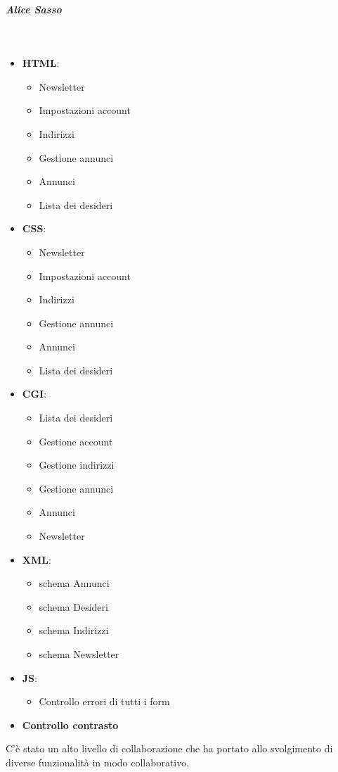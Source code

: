 	\subparagraph{Alice Sasso}~
		
		\begin{itemize}
		\item \textbf{HTML}:
			\begin{itemize}
				\item Newsletter
				\item Impostazioni account
				\item Indirizzi
				\item Gestione annunci
				\item Annunci
				\item Lista dei desideri
			\end{itemize}
		
		\item \textbf{CSS}:
			\begin{itemize}
				\item Newsletter
				\item Impostazioni account
				\item Indirizzi
				\item Gestione annunci
				\item Annunci
				\item Lista dei desideri
			\end{itemize}
		\item \textbf{CGI}:
			\begin{itemize}
				\item Lista dei desideri
				\item Gestione account
				\item Gestione indirizzi
				\item Gestione annunci
				\item Annunci
				\item Newsletter
			\end{itemize}
		
		\item \textbf{XML}:
			\begin{itemize}
			 	\item schema Annunci
			 	\item schema Desideri
			 	\item schema Indirizzi
			 	\item schema Newsletter
			\end{itemize}
		\item \textbf{JS}:
			\begin{itemize}
				\item Controllo errori di tutti i form
			\end{itemize}
		\item \textbf{Controllo contrasto}
	\end{itemize}
	
	C'è stato un alto livello di collaborazione che ha portato allo svolgimento di diverse funzionalità in modo collaborativo.
	
